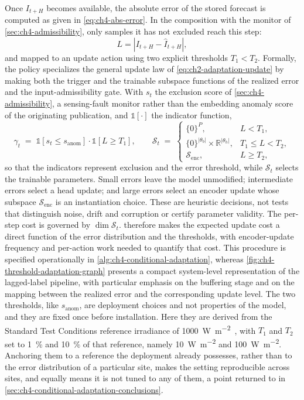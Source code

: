 Once $I_{t+H}$ becomes available, the absolute error of the stored forecast is computed as given in \cref{eq:ch4-abs-error}. In the composition with the monitor of \cref{sec:ch4-admissibility}, only samples it has not excluded reach this step:
\begin{equation}
\label{eq:ch4-abs-error}
L = \left|I_{t+H} - \hat I_{t+H}\right|,
\end{equation}
and mapped to an update action using two explicit thresholds $T_1<T_2$. Formally, the policy specializes the general update law of \cref{eq:ch2-adaptation-update} by making both the trigger and the trainable subspace functions of the realized error and the input-admissibility gate. With $s_t$ the exclusion score of \cref{sec:ch4-admissibility}, a sensing-fault monitor rather than the embedding anomaly score of the originating publication, and $\mathbb{1}[\cdot]$ the indicator function,
\begin{equation}
\label{eq:ch4-update-trigger}
\gamma_t \;=\; \mathbb{1}\!\left[s_t \le s_{\mathrm{anom}}\right]\cdot\mathbb{1}\!\left[L \ge T_1\right],
\qquad
\mathcal{S}_t \;=\;
\begin{cases}
\{0\}^{P}, & L < T_1,\\[2pt]
\{0\}^{|\theta_b|}\times\mathbb{R}^{|\theta_h|}, & T_1 \le L < T_2,\\[2pt]
\mathcal{S}_{\mathrm{enc}}, & L \ge T_2,
\end{cases}
\end{equation}
so that the indicators represent exclusion and the error threshold, while $\mathcal{S}_t$ selects the trainable parameters. Small errors leave the model unmodified; intermediate errors select a head update; and large errors select an encoder update whose subspace $\mathcal{S}_{\mathrm{enc}}$ is an instantiation choice. These are heuristic decisions, not tests that distinguish noise, drift and corruption or certify parameter validity. The per-step cost is governed by $\dim\mathcal{S}_t$.  therefore makes the expected update cost a direct function of the error distribution and the thresholds, with encoder-update frequency and per-action work needed to quantify that cost. This procedure is specified operationally in \cref{alg:ch4-conditional-adaptation}, whereas \cref{fig:ch4-threshold-adaptation-graph} presents a compact system-level representation of the lagged-label pipeline, with particular emphasis on the buffering stage and on the mapping between the realized error and the corresponding update level. The two thresholds, like $s_{\mathrm{anom}}$, are deployment choices and not properties of the model, and they are fixed once before installation. Here they are derived from the Standard Test Conditions reference irradiance of \SI{1000}{\watt\per\square\meter}~\cite{dunlop2010guidelines}, with $T_1$ and $T_2$ set to \SI{1}{\percent} and \SI{10}{\percent} of that reference, namely \SI{10}{\watt\per\square\meter} and \SI{100}{\watt\per\square\meter}. Anchoring them to a reference the deployment already possesses, rather than to the error distribution of a particular site, makes the setting reproducible across sites, and equally means it is not tuned to any of them, a point returned to in \cref{sec:ch4-conditional-adaptation-conclusions}.

